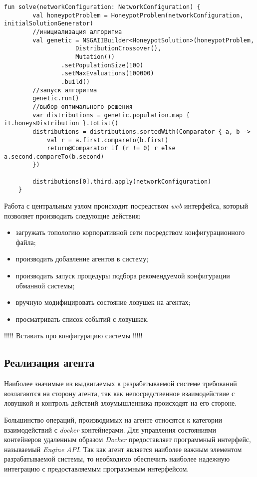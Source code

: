 \begin{lstlisting}[style=kotlinstyle, label=lst:crossover]
	fun solve(networkConfiguration: NetworkConfiguration) {
	    val honeypotProblem = HoneypotProblem(networkConfiguration, initialSolutionGenerator)
	    //инициализация алгоритма
	    val genetic = NSGAIIBuilder<HoneypotSolution>(honeypotProblem,
	                DistributionCrossover(), 
	                Mutation())
	            .setPopulationSize(100)
	            .setMaxEvaluations(100000)
	            .build()
	    //запуск алгоритма
	    genetic.run()
	    //выбор оптимального решения
	    var distributions = genetic.population.map { it.honeysDistribution }.toList()
	    distributions = distributions.sortedWith(Comparator { a, b ->
	        val r = a.first.compareTo(b.first)
	        return@Comparator if (r != 0) r else a.second.compareTo(b.second)
	    })

	    distributions[0].third.apply(networkConfiguration)
	}
\end{lstlisting}

Работа с центральным узлом происходит посредством \textit{web} интерфейса, который позволяет производить следующие действия:
\begin{itemize}
	\item загружать топологию корпоративной сети посредством конфигурационного файла;
	\item производить добавление агентов в систему;
	\item производить запуск процедуры подбора рекомендуемой конфигурации обманной системы;
	\item вручную модифицировать состояние ловушек на агентах;
	\item просматривать список событий с ловушкек.
\end{itemize}

!!!!!
Вставить про конфигурацию системы
!!!!!


\subsection{Реализация агента}

Наиболее значимые из выдвигаемых к разрабатываемой системе требований возлагаются на сторону агента, так как непосредственное взаимодействие с ловушкой и контроль действий злоумышленника происходят на его стороне.

Большинство операций, производимых на агенте относятся к категории взаимодействий с \textit{docker} контейнерами. Для управления состояниями контейнеров удаленным образом \textit{Docker} предоставляет программный интерфейс, называемый \textit{Engine} \textit{API}. Так как агент является наиболее важным элементом разрабатываемой системы, то необходимо обеспечить наиболее надежную интеграцию с предоставляемым программным интерфейсом.

